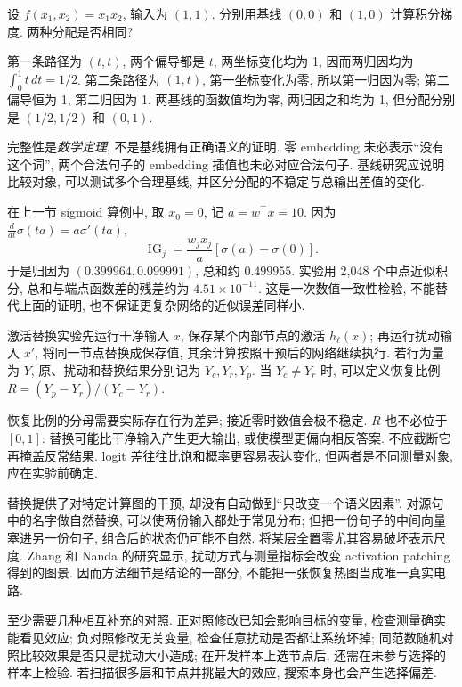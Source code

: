 \begin{example}
设 $f(x_1,x_2)=x_1x_2$, 输入为 $(1,1)$. 分别用基线 $(0,0)$ 和 $(1,0)$ 计算积分梯度. 两种分配是否相同?
\end{example}
\begin{solution}
第一条路径为 $(t,t)$, 两个偏导都是 $t$, 两坐标变化均为 1, 因而两归因均为 $\int_0^1t\,dt=1/2$. 第二条路径为 $(1,t)$, 第一坐标变化为零, 所以第一归因为零; 第二偏导恒为 1, 第二归因为 1. 两基线的函数值均为零, 两归因之和均为 1, 但分配分别是 $(1/2,1/2)$ 和 $(0,1)$.
\end{solution}
完整性是\emph{数学定理}, 不是基线拥有正确语义的证明. 零 embedding 未必表示“没有这个词”, 两个合法句子的 embedding 插值也未必对应合法句子. 基线研究应说明比较对象, 可以测试多个合理基线, 并区分分配的不稳定与总输出差值的变化.

在上一节 sigmoid 算例中, 取 $x_0=0$, 记 $a=w^\top x=10$. 因为 $\frac{d}{dt}\sigma(ta)=a\sigma'(ta)$,
\[
\operatorname{IG}_j=\frac{w_jx_j}{a}[\sigma(a)-\sigma(0)].
\]
于是归因为 $(0.399964,0.099991)$, 总和约 $0.499955$. 实验用 2,048 个中点近似积分, 总和与端点函数差的残差约为 $4.51\times10^{-11}$. 这是一次数值一致性检验, 不能替代上面的证明, 也不保证更复杂网络的近似误差同样小.

\begin{definition}
激活替换实验先运行干净输入 $x$, 保存某个内部节点的激活 $h_\ell(x)$; 再运行扰动输入 $x'$, 将同一节点替换成保存值, 其余计算按照干预后的网络继续执行. 若行为量为 $Y$, 原、扰动和替换结果分别记为 $Y_c,Y_r,Y_p$. 当 $Y_c\ne Y_r$ 时, 可以定义恢复比例 $R=(Y_p-Y_r)/(Y_c-Y_r)$.
\end{definition}
恢复比例的分母需要实际存在行为差异; 接近零时数值会极不稳定. $R$ 也不必位于 $[0,1]$: 替换可能比干净输入产生更大输出, 或使模型更偏向相反答案. 不应截断它再掩盖反常结果. logit 差往往比饱和概率更容易表达变化, 但两者是不同测量对象, 应在实验前确定.

替换提供了对特定计算图的干预, 却没有自动做到“只改变一个语义因素”. 对源句中的名字做自然替换, 可以使两份输入都处于常见分布; 但把一份句子的中间向量塞进另一份句子, 组合后的状态仍可能不自然. 将某层全置零尤其容易破坏表示尺度. Zhang 和 Nanda 的研究显示, 扰动方式与测量指标会改变 activation patching 得到的图景\cite{patching}. 因而方法细节是结论的一部分, 不能把一张恢复热图当成唯一真实电路.

至少需要几种相互补充的对照. 正对照修改已知会影响目标的变量, 检查测量确实能看见效应; 负对照修改无关变量, 检查任意扰动是否都让系统坏掉; 同范数随机对照比较效果是否只是扰动大小造成; 在开发样本上选节点后, 还需在未参与选择的样本上检验. 若扫描很多层和节点并挑最大的效应, 搜索本身也会产生选择偏差.

